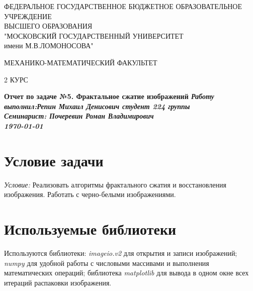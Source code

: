 \documentclass[12pt, fleqn]{article}
\begin{document}
\begin{titlepage}

\begin{center}
\large ФЕДЕРАЛЬНОЕ ГОСУДАРСТВЕННОЕ БЮДЖЕТНОЕ \linebreak
ОБРАЗОВАТЕЛЬНОЕ УЧРЕЖДЕНИЕ \\ ВЫСШЕГО ОБРАЗОВАНИЯ \\
"МОСКОВСКИЙ ГОСУДАРСТВЕННЫЙ УНИВЕРСИТЕТ \\ имени М.В.ЛОМОНОСОВА"
\end{center}

\begin{center}
\vspace{5mm}\Large МЕХАНИКО-МАТЕМАТИЧЕСКИЙ ФАКУЛЬТЕТ
\end{center}

\begin{center}
\vspace{5mm}\Large 2 КУРС
\end{center}


\begin{center}
\vspace{5mm}\bf\Large{Отчет по задаче №5. Фрактальное сжатие изображений }\linebreak
\vfill
\it{Работу выполнил:\hfil Репин Михаил Денисович студент 224 группы\\}
\it{Семинарист: \hfill Почеревин Роман Владимирович\\}
\today
\end{center}
\end{titlepage}

\setcounter{page}{2}

\tableofcontents{}

\newpage
\section{Условие задачи}

\large {\it Условие:} Реализовать алгоритмы фрактального сжатия и восстановления изображения. Работать с черно-белыми изображениями.
\section{Используемые библиотеки}
Используются библиотеки: \large{\it imageio.v2} для открытия и записи изображений; \large{\it numpy} для удобной работы с числовыми массивами и выполнения математических операций;
библиотека \large{\it  matplotlib} для вывода в одном окне всех итераций распаковки изображения.
\end{document}
